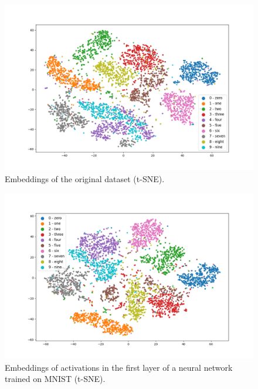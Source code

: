 \documentclass{article}
\begin{document}
\begin{figure}
  \centering
    \includegraphics[width=1.0\textwidth]{../../out/activations_cnn/mnist/t-sne/trained/plot_l0.png}
    \caption{Embeddings of the original dataset (t-SNE).}
\end{figure}

\begin{figure}
  \centering
    \includegraphics[width=1.0\textwidth]{../../out/activations_cnn/mnist/t-sne/trained/plot_l1_f0.png}
    \caption{Embeddings of activations in the first layer of a neural network trained on MNIST (t-SNE).}
\end{figure}
\end{document}
